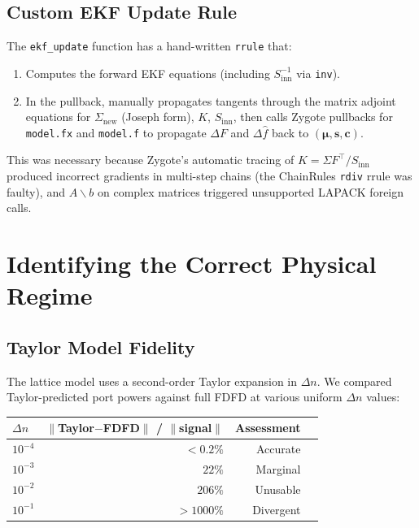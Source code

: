 \documentclass[11pt,a4paper]{article}
\begin{document}
\subsection{Custom EKF Update Rule}

The \texttt{ekf\_update} function has a hand-written \texttt{rrule} that:
\begin{enumerate}[nosep]
  \item Computes the forward EKF equations (including $S_{\text{inn}}^{-1}$ via \texttt{inv}).
  \item In the pullback, manually propagates tangents through the matrix adjoint equations for $\Sigma_{\text{new}}$ (Joseph form), $K$, $S_{\text{inn}}$, then calls Zygote pullbacks for \texttt{model.fx} and \texttt{model.f} to propagate $\Delta F$ and $\Delta\hat{f}$ back to $(\bm{\mu}, \bm{s}, \bm{c})$.
\end{enumerate}

This was necessary because Zygote's automatic tracing of $K = \Sigma F^\top / S_{\text{inn}}$ produced incorrect gradients in multi-step chains (the ChainRules \texttt{rdiv} rrule was faulty), and $A \backslash b$ on complex matrices triggered unsupported LAPACK foreign calls.

\section{Identifying the Correct Physical Regime}

\subsection{Taylor Model Fidelity}

The lattice model uses a second-order Taylor expansion in $\Delta n$.  We compared Taylor-predicted port powers against full FDFD at various uniform $\Delta n$ values:

\begin{center}
\begin{tabular}{@{}lrrr@{}}
\toprule
$\Delta n$ & $\|$Taylor$-$FDFD$\|$ / $\|$signal$\|$ & Assessment \\
\midrule
$10^{-4}$ & $< 0.2\%$ & Accurate \\
$10^{-3}$ & $22\%$ & Marginal \\
$10^{-2}$ & $206\%$ & Unusable \\
$10^{-1}$ & $>1000\%$ & Divergent \\
\bottomrule
\end{tabular}
\end{center}
\end{document}
